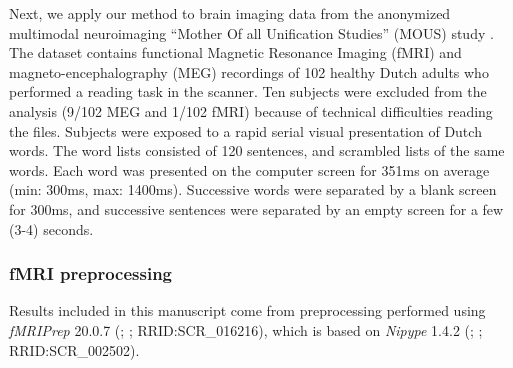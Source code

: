 
Next, we apply our method to brain imaging data from the anonymized multimodal
neuroimaging ``Mother Of all Unification Studies'' (MOUS) study
\citep{schoffelen2019204}. The dataset contains functional Magnetic Resonance
Imaging (fMRI) and magneto-encephalography (MEG)
recordings of 102 healthy Dutch adults who performed a reading
task in the scanner. Ten subjects were excluded from the analysis (9/102 MEG and 1/102 fMRI)
because of technical difficulties reading the files.
%
Subjects were exposed to a rapid serial visual presentation of Dutch words. The
word lists consisted of 120 sentences, and scrambled lists of the same words.
Each word was presented on the computer screen for 351ms on average (min: 300ms,
max: 1400ms). Successive words were separated by a blank screen for 300ms, and
successive sentences were separated by an empty screen for a few (3-4) seconds.

\subsubsection{fMRI preprocessing}
Results included in this manuscript come from preprocessing performed
using \emph{fMRIPrep} 20.0.7 (\citep{fmriprep1}; \citep{fmriprep2};
RRID:SCR\_016216), which is based on \emph{Nipype} 1.4.2
(\citep{nipype1}; \citep{nipype2}; RRID:SCR\_002502).

